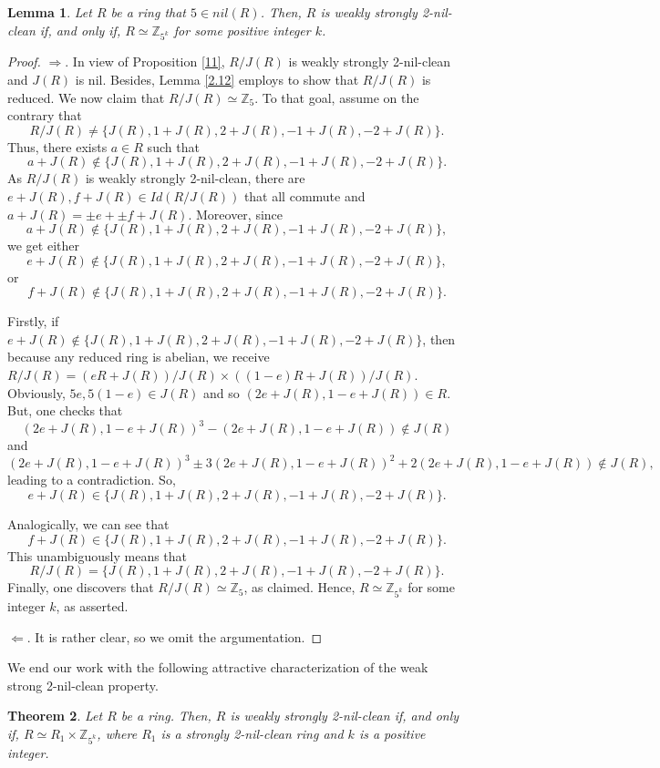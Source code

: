 \documentclass[12pt]{amsart}
\newtheorem{theorem}{Theorem}[section]
\newtheorem{lemma}[theorem]{Lemma}
\theoremstyle{definition}
\begin{document}
\begin{lemma}\label{5} Let $R$ be a ring that $5\in nil(R)$. Then, $R$ is weakly strongly 2-nil-clean if, and only if, $R\simeq\mathbb{Z}_{5^k}$ for some positive integer $k$.
\end{lemma}

\begin{proof} $\Rightarrow $. In view of Proposition \ref{11}, $R/J(R)$ is weakly strongly 2-nil-clean and $J(R)$ is nil. Besides, Lemma \ref{2.12} employs to show that $R/J(R)$ is reduced. We now claim that $R/J(R)\simeq \mathbb{Z}_5$. To that goal, assume on the contrary that $$R/J(R)\neq \{J(R),1+J(R),2+J(R),-1+J(R),-2+J(R)\}.$$ Thus, there exists $a\in R$ such that $$a+J(R)\not\in  \{J(R),1+J(R),2+J(R),-1+J(R),-2+J(R)\}.$$ As $R/J(R)$ is weakly strongly 2-nil-clean, there are $e+J(R),f+J(R)\in Id(R/J(R))$ that all commute and $a+J(R)=\pm e+\pm f+J(R)$. Moreover, since $$a+J(R)\not\in  \{J(R),1+J(R),2+J(R),-1+J(R),-2+J(R)\},$$ we get either $$e+J(R)\not\in \{J(R),1+J(R),2+J(R),-1+J(R),-2+J(R)\},$$ or $$f+J(R)\not\in \{J(R),1+J(R),2+J(R),-1+J(R),-2+J(R)\}.$$ 

Firstly, if $e+J(R)\not\in \{J(R),1+J(R),2+J(R),-1+J(R),-2+J(R)\}$, then because any reduced ring is abelian, we receive $R/J(R)=(eR+J(R))/J(R)\times ((1-e)R+J(R))/J(R)$. Obviously, $5e,5(1-e)\in J(R)$ and so $(2e+J(R),1-e+J(R))\in R$. But, one checks that $$(2e+J(R),1-e+J(R))^3-(2e+J(R),1-e+J(R))\not\in J(R)$$ and $$(2e+J(R),1-e+J(R))^3\pm 3(2e+J(R),1-e+J(R))^2+2(2e+J(R),1-e+J(R))\not\in J(R),$$ leading to a contradiction. So, $$e+J(R)\in \{J(R),1+J(R),2+J(R),-1+J(R),-2+J(R)\}.$$ 

Analogically, we can see that $$f+J(R)\in \{J(R),1+J(R),2+J(R),-1+J(R),-2+J(R)\}.$$ This unambiguously means that $$R/J(R)=\{J(R),1+J(R),2+J(R),-1+J(R),-2+J(R)\}.$$ Finally, one discovers that $R/J(R)\simeq \mathbb{Z}_5$, as claimed. Hence, $R\simeq \mathbb{Z}_{5^k}$ for some integer $k$, as asserted.

$\Leftarrow$. It is rather clear, so we omit the argumentation.
\end{proof}

We end our work with the following attractive characterization of the weak strong 2-nil-clean property.

\begin{theorem}\label{maj} Let $R$ be a ring. Then, $R$ is weakly strongly 2-nil-clean if, and only if, $R\simeq R_1\times \mathbb{Z}_{5^k}$, where $R_1$ is a strongly 2-nil-clean ring and $k$ is a positive integer.
\end{theorem}
\end{document}
